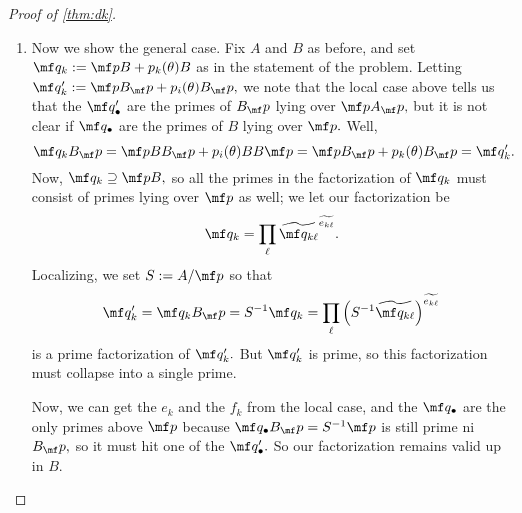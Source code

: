 \begin{proof}[Proof of \autoref{thm:dk}]
\begin{enumerate}
		\item Now we show the general case. Fix $A$ and $B$ as before, and set $\mf q_k:=\mf pB+p_k(\theta)B$ as in the statement of the problem. Letting $\mf q_k':=\mf pB_\mf p+p_i(\theta)B_\mf p,$ we note that the local case above tells us that the $\mf q_\bullet'$ are the primes of $B_\mf p$ lying over $\mf pA_\mf p,$ but it is not clear if $\mf q_\bullet$ are the primes of $B$ lying over $\mf p.$ Well,
		\[\mf q_kB_\mf p=\mf pBB_\mf p+p_i(\theta)BB\mf p=\mf pB_\mf p+p_k(\theta)B_\mf p=\mf q_k'.\]
		Now, $\mf q_k\supseteq\mf pB,$ so all the primes in the factorization of $\mf q_k$ must consist of primes lying over $\mf p$ as well; we let our factorization be
		\[\mf q_k=\prod_\ell\widetilde{\mf q_{k\ell}}^{\widetilde{e_{k\ell}}}.\]
		Localizing, we set $S:=A/\mf p$ so that
		\[\mf q_k'=\mf q_kB_\mf p=S^{-1}\mf q_k=\prod_\ell\left(S^{-1}\widetilde{\mf q_{k\ell}}\right)^{\widetilde{e_{k\ell}}}\]
		is a prime factorization of $\mf q_k'.$ But $\mf q_k'$ is prime, so this factorization must collapse into a single prime.

		Now, we can get the $e_k$ and the $f_k$ from the local case, and the $\mf q_\bullet$ are the only primes above $\mf p$ because $\mf q_\bullet B_\mf p=S^{-1}\mf p$ is still prime ni $B_\mf p,$ so it must hit one of the $\mf q_\bullet'.$ So our factorization remains valid up in $B.$
		\qedhere
	\end{enumerate}
\end{proof}